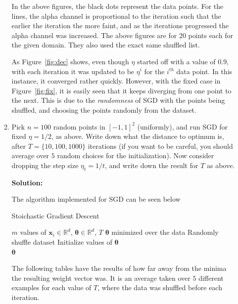 \documentclass[12pt]{article}
\newcommand{\grad}{\nabla}
\renewcommand{\P}[1]{\left( #1 \right)}
\begin{document}
\begin{enumerate}
\begin{enumerate}
In the above figures, the black dots represent the data points. For the lines, the alpha channel is proportional to the iteration such that the earlier the iteration the more faint, and as the iterations progressed the alpha channel was increased. The above figures are for 20 points each for the given domain. They also used the exact same shuffled list.

As Figure~\ref{fig:dec} shows, even though $\eta$ started off with a value of $0.9$, with each iteration it was updated to be $\eta^{i}$ for the $i^{th}$ data point. In this instance, it converged rather quickly. However, with the fixed case in Figure~\ref{fig:fix}, it is easily seen that it keeps diverging from one point to the next. This is due to the {\em randomness} of SGD with the points being shuffled, and choosing the points randomly from the dataset. 

\item Pick $n = 100$ random points in $[-1, 1]^{2}$ (uniformly), and run SGD for fixed $\eta = 1/2$, as above. Write down what the distance to optimum is, after $T = \{ 10, 100, 1000\}$ iterations (if you want to be careful, you should average over $5$ random choices for the initialization). Now consider dropping the step size $\eta_{t} = 1/t$, and write down the result for $T$ as above.

      {\bf Solution:}

The algorithm implemented for SGD can be seen below

\begin{minipage}{\linewidth}
\begin{algorithm}[H]
\caption{Stoichastic Gradient Descent}\label{SGD}
\begin{algorithmic}[1]
\Input $m$ values of $\bm{x}_{i} \in \mathbb{R}^{d}$, $\bm{\theta} \in \mathbb{R}^{d}$, $T$
\Output $\bm{\theta}$ minimized over the data
\State Randomly shuffle dataset
\State Initialize values of $\bm{\theta}$
    \For{$i = 1, 2, \ldots, T$}{
      \State $\theta_{j}\gets \theta_{j} - \eta \grad_{\theta} J\P{\bm{\theta}, \bm{x}_{i}}$
      \Comment for every $j = \left\{ 0, 1, \ldots, \mathbb{R}^{d}\right\}$
    \EndFor}\\
\Return $\bm{\theta}$
\end{algorithmic}
\end{algorithm}
\end{minipage}

The following tables have the results of how far away from the minima the resulting weight vector was. It is an average taken over $5$ different examples for each value of $T$, where the data was shuffled before each iteration. 


\end{enumerate}
\end{enumerate}
\end{document}
